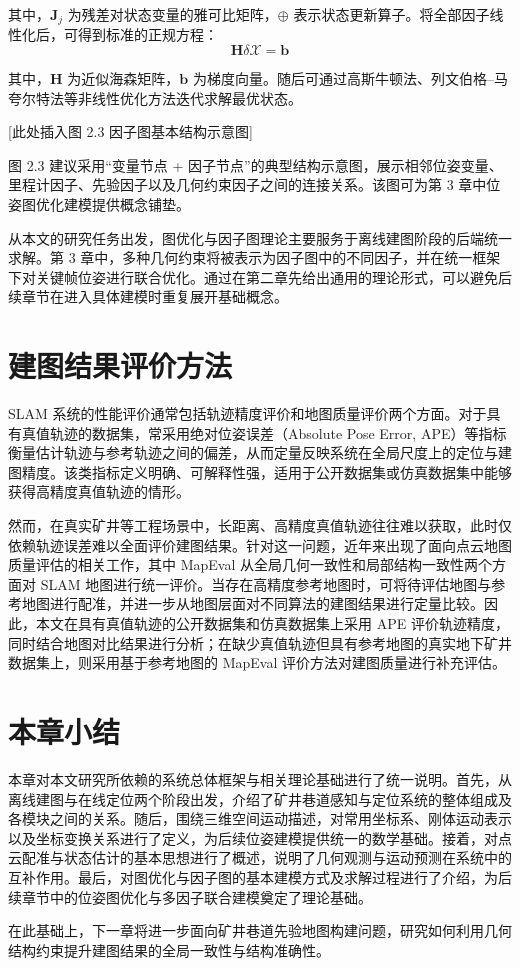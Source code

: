 其中，$\mathbf{J}_{j}$ 为残差对状态变量的雅可比矩阵，$\oplus$ 表示状态更新算子。将全部因子线性化后，可得到标准的正规方程：
\begin{equation}
\mathbf{H}\delta \mathcal{X}
=
\mathbf{b}
\end{equation}

其中，$\mathbf{H}$ 为近似海森矩阵，$\mathbf{b}$ 为梯度向量。随后可通过高斯牛顿法、列文伯格--马夸尔特法等非线性优化方法迭代求解最优状态。

[此处插入图 2.3 因子图基本结构示意图]

图 2.3 建议采用“变量节点 + 因子节点”的典型结构示意图，展示相邻位姿变量、里程计因子、先验因子以及几何约束因子之间的连接关系。该图可为第 3 章中位姿图优化建模提供概念铺垫。

从本文的研究任务出发，图优化与因子图理论主要服务于离线建图阶段的后端统一求解。第 3 章中，多种几何约束将被表示为因子图中的不同因子，并在统一框架下对关键帧位姿进行联合优化。通过在第二章先给出通用的理论形式，可以避免后续章节在进入具体建模时重复展开基础概念。

\section{建图结果评价方法}

SLAM 系统的性能评价通常包括轨迹精度评价和地图质量评价两个方面。对于具有真值轨迹的数据集，常采用绝对位姿误差（Absolute Pose Error, APE）等指标衡量估计轨迹与参考轨迹之间的偏差，从而定量反映系统在全局尺度上的定位与建图精度。该类指标定义明确、可解释性强，适用于公开数据集或仿真数据集中能够获得高精度真值轨迹的情形。

然而，在真实矿井等工程场景中，长距离、高精度真值轨迹往往难以获取，此时仅依赖轨迹误差难以全面评价建图结果。针对这一问题，近年来出现了面向点云地图质量评估的相关工作，其中 MapEval 从全局几何一致性和局部结构一致性两个方面对 SLAM 地图进行统一评价。当存在高精度参考地图时，可将待评估地图与参考地图进行配准，并进一步从地图层面对不同算法的建图结果进行定量比较。因此，本文在具有真值轨迹的公开数据集和仿真数据集上采用 APE 评价轨迹精度，同时结合地图对比结果进行分析；在缺少真值轨迹但具有参考地图的真实地下矿井数据集上，则采用基于参考地图的 MapEval 评价方法对建图质量进行补充评估。

\section{本章小结}

本章对本文研究所依赖的系统总体框架与相关理论基础进行了统一说明。首先，从离线建图与在线定位两个阶段出发，介绍了矿井巷道感知与定位系统的整体组成及各模块之间的关系。随后，围绕三维空间运动描述，对常用坐标系、刚体运动表示以及坐标变换关系进行了定义，为后续位姿建模提供统一的数学基础。接着，对点云配准与状态估计的基本思想进行了概述，说明了几何观测与运动预测在系统中的互补作用。最后，对图优化与因子图的基本建模方式及求解过程进行了介绍，为后续章节中的位姿图优化与多因子联合建模奠定了理论基础。

在此基础上，下一章将进一步面向矿井巷道先验地图构建问题，研究如何利用几何结构约束提升建图结果的全局一致性与结构准确性。
